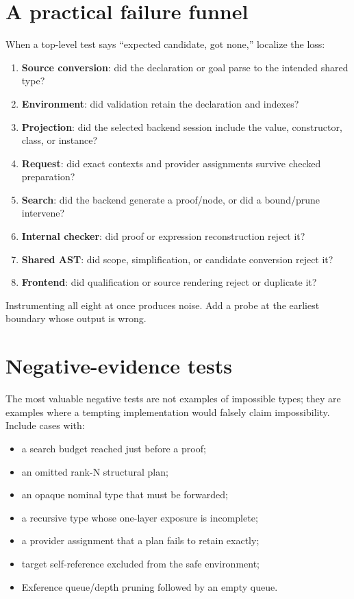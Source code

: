 \documentclass[10pt,letterpaper,oneside]{report}
\newcommand{\term}[1]{\textbf{#1}}
\begin{document}
\section{A practical failure funnel}\label{sec:djex-failure-funnel}

When a top-level test says ``expected candidate, got none,'' localize the loss:

\begin{enumerate}
  \item \term{Source conversion}: did the declaration or goal parse to the intended shared type?
  \item \term{Environment}: did validation retain the declaration and indexes?
  \item \term{Projection}: did the selected backend session include the value, constructor, class, or instance?
  \item \term{Request}: did exact contexts and provider assignments survive checked preparation?
  \item \term{Search}: did the backend generate a proof/node, or did a bound/prune intervene?
  \item \term{Internal checker}: did proof or expression reconstruction reject it?
  \item \term{Shared AST}: did scope, simplification, or candidate conversion reject it?
  \item \term{Frontend}: did qualification or source rendering reject or duplicate it?
\end{enumerate}

Instrumenting all eight at once produces noise. Add a probe at the earliest boundary whose output is wrong.

\section{Negative-evidence tests}

The most valuable negative tests are not examples of impossible types; they are examples where a tempting implementation would falsely claim impossibility. Include cases with:

\begin{itemize}
  \item a search budget reached just before a proof;
  \item an omitted rank-N structural plan;
  \item an opaque nominal type that must be forwarded;
  \item a recursive type whose one-layer exposure is incomplete;
  \item a provider assignment that a plan fails to retain exactly;
  \item target self-reference excluded from the safe environment;
  \item Exference queue/depth pruning followed by an empty queue.
\end{itemize}
\end{document}
